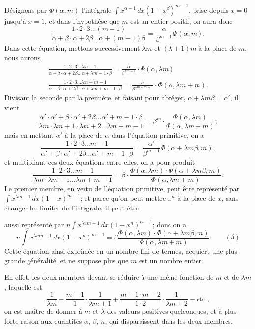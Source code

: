 \documentclass{article}
\begin{document}
Désignons par $\Phi(\alpha,m)$ l'intégrale $\displaystyle\int x^{\alpha-1}\,dx(1-x^{\beta})^{m-1}$, prise depuis $x=0$ jusqu'à $x=1$, et dans l'hypothèse que $m$ est un entier positif, on aura donc
\[ \frac{1\cdot 2\cdot 3\ldots(m-1)}{\alpha+\beta\cdot\alpha+2\beta\ldots\alpha+(m-1)\beta}=\frac{\alpha}{\beta^{m-1}}\Phi(\alpha,m). \]
Dans cette équation, mettons successivement $\lambda m$ et $(\lambda+1)m$ à la place de $m$, nous aurons
\[ \begin{gathered} \frac{1\cdot 2\cdot 3\ldots\overline{\lambda m-1}}{\alpha+\beta\cdot\alpha+2\beta\ldots\alpha+\overline{\lambda m-1}\cdot\beta}=\frac{\alpha}{\beta^{\lambda m-1}}\cdot\Phi(\alpha,\lambda m)\\ \frac{1\cdot 2\cdot 3\ldots\overline{\lambda m+m-1}}{\alpha+\beta\cdot\alpha+2\beta\ldots\alpha+\overline{\lambda m+m-1}\cdot\beta}=\frac{\alpha}{\beta^{\lambda m+m-1}}\cdot\Phi(\alpha,\lambda m+m). \end{gathered} \]
Divisant la seconde par la première, et faisant pour abréger, $\alpha+\lambda m\beta=\alpha'$, il vient
\[ \frac{\alpha'\cdot\alpha'+\beta\cdot\alpha'+2\beta\ldots\alpha'+\overline{m-1}\cdot\beta}{\lambda m\cdot\lambda m+1\cdot\lambda m+2\ldots\lambda m+m-1}=\beta^{m}\cdot\frac{\Phi(\alpha,\lambda m)}{\Phi(\alpha,\lambda m+m)}; \]
mais en mettant $\alpha'$ à la place de $\alpha$ dans l'équation primitive, on a
\[ \frac{1\cdot 2\cdot 3\ldots m-1}{\alpha'+\beta\cdot\alpha'+2\beta\ldots\alpha'+\overline{m-1}\cdot\beta}=\frac{\alpha'}{\beta^{m-1}}\Phi(\alpha+\lambda m\beta,m), \]
et multipliant ces deux équations entre elles, on a pour produit
\[ \frac{1\cdot 2\cdot 3\ldots m-1}{\lambda m\cdot\lambda m+1\ldots\lambda m+m-1}=\beta\cdot\frac{\Phi(\alpha,\lambda m)\cdot\Phi(\alpha+\lambda m\beta,m)}{\Phi(\alpha,\lambda m+m)}. \]
Le premier membre, en vertu de l'équation primitive, peut être représenté par $\displaystyle\int x^{\lambda m-1}\,dx(1-x)^{m-1}$; et parce qu'on peut mettre $x^{n}$ à la place de $x$, sans changer les limites de l'intégrale, il peut être

aussi représenté par $\displaystyle n\int x^{\lambda nm-1}\,dx(1-x^{n})^{m-1}$; donc on a
\[ n\int x^{\lambda mn-1}\,dx(1-x^{n})^{m-1}=\beta\frac{\Phi(\alpha,\lambda m)\cdot\Phi(\alpha+\lambda m\beta,m)}{\Phi(\alpha,\lambda m+m)}.\qquad(\delta) \]
Cette équation ainsi exprimée en un nombre fini de termes, acquiert une plus grande généralité, et ne suppose plus que $m$ est un nombre entier.

En effet, les deux membres devant se réduire à une même fonction de $m$ et de $\lambda m$, laquelle est
\[ \frac{1}{\lambda m}-\frac{m-1}{1}\cdot\frac{1}{\lambda m+1}+\frac{m-1\cdot m-2}{1\cdot 2}\cdot\frac{1}{\lambda m+2}-\text{etc.}, \]
on est maître de donner à $m$ et $\lambda$ des valeurs positives quelconques, et à plus forte raison aux quantités $\alpha$, $\beta$, $n$, qui disparaissent dans les deux membres.
\end{document}
